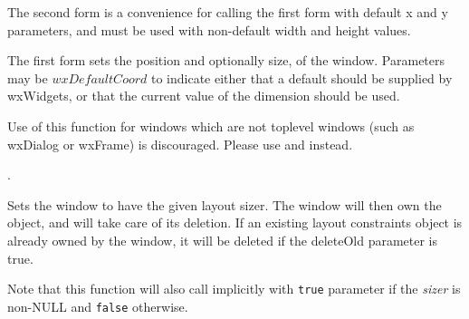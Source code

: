 
The second form is a convenience for calling the first form with default
x and y parameters, and must be used with non-default width and height values.

The first form sets the position and optionally size, of the window.
Parameters may be $wxDefaultCoord$ to indicate either that a default should be supplied
by wxWidgets, or that the current value of the dimension should be used.





\label{wxwindowsetsizehints}

Use of this function for windows which are not toplevel windows
(such as wxDialog or wxFrame) is discouraged. Please use 
 and 
instead.


.


\label{wxwindowsetsizer}


Sets the window to have the given layout sizer. The window
will then own the object, and will take care of its deletion.
If an existing layout constraints object is already owned by the
window, it will be deleted if the deleteOld parameter is true.

Note that this function will also call
 implicitly with {\tt true}
parameter if the {\it sizer}\/ is non-NULL and {\tt false} otherwise.



